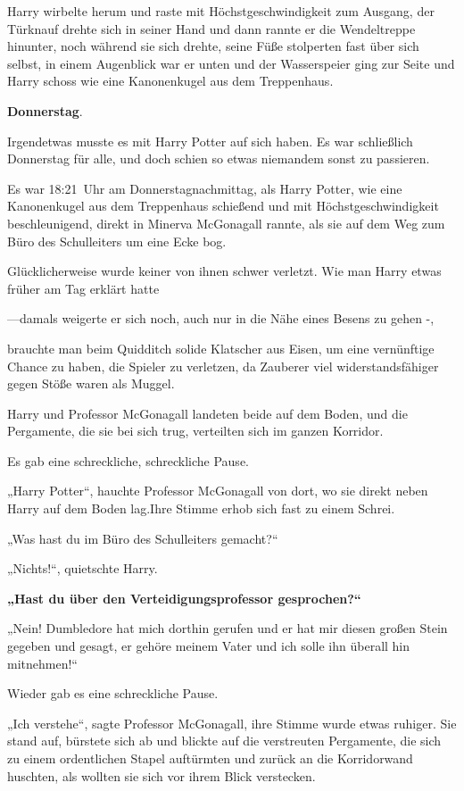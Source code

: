 {Harry wirbelte herum und raste mit Höchstgeschwindigkeit zum Ausgang, der Türknauf drehte sich in seiner Hand und dann rannte er die Wendeltreppe hinunter, noch während sie sich drehte, seine Füße stolperten fast über sich selbst, in einem Augenblick war er unten und der Wasserspeier ging zur Seite und Harry schoss wie eine Kanonenkugel aus dem Treppenhaus.

\textbf{Donnerstag}.

Irgendetwas musste es mit Harry Potter auf sich haben. Es war schließlich Donnerstag für alle, und doch schien so etwas niemandem sonst zu passieren.

Es war 18:21~Uhr am Donnerstagnachmittag, als Harry Potter, wie eine Kanonenkugel aus dem Treppenhaus schießend und mit Höchstgeschwindigkeit beschleunigend, direkt in Minerva McGonagall rannte, als sie auf dem Weg zum Büro des Schulleiters um eine Ecke bog.

Glücklicherweise wurde keiner von ihnen schwer verletzt. Wie man Harry etwas früher am Tag erklärt hatte

—damals weigerte er sich noch, auch nur in die Nähe eines Besens zu gehen -,

brauchte man beim Quidditch solide Klatscher aus Eisen, um eine vernünftige Chance zu haben, die Spieler zu verletzen, da Zauberer viel widerstandsfähiger gegen Stöße waren als Muggel.

Harry und Professor McGonagall landeten beide auf dem Boden, und die Pergamente, die sie bei sich trug, verteilten sich im ganzen Korridor.

Es gab eine schreckliche, schreckliche Pause.

„Harry Potter“, hauchte Professor McGonagall von dort, wo sie direkt neben Harry auf dem Boden lag.Ihre Stimme erhob sich fast zu einem Schrei.

„Was hast du im Büro des Schulleiters gemacht?“

„Nichts!“, quietschte Harry.

\textbf{„Hast du über den Verteidigungsprofessor gesprochen?“}

„Nein! Dumbledore hat mich dorthin gerufen und er hat mir diesen großen Stein gegeben und gesagt, er gehöre meinem Vater und ich solle ihn überall hin mitnehmen!“

Wieder gab es eine schreckliche Pause.

„Ich verstehe“, sagte Professor McGonagall, ihre Stimme wurde etwas ruhiger. Sie stand auf, bürstete sich ab und blickte auf die verstreuten Pergamente, die sich zu einem ordentlichen Stapel auftürmten und zurück an die Korridorwand huschten, als wollten sie sich vor ihrem Blick verstecken.

}
